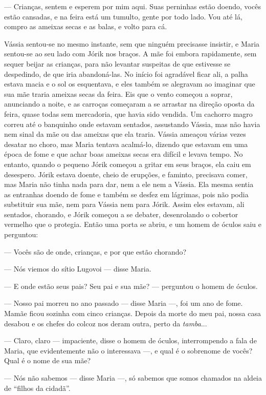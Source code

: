 --- Crianças, sentem e esperem por mim aqui. Suas perninhas estão
doendo, vocês estão cansadas, e na feira está um tumulto, gente por todo
lado. Vou até lá, compro as ameixas secas e as balas, e volto para cá.

Vássia sentou-se no mesmo instante, sem que ninguém precisasse insistir,
e Maria sentou-se ao seu lado com Jórik nos braços. A mãe foi embora
rapidamente, sem sequer beijar as crianças, para não levantar suspeitas
de que estivesse se despedindo, de que iria abandoná-las. No início foi
agradável ficar ali, a palha estava macia e o sol os esquentava, e eles
também se alegravam ao imaginar que sua mãe traria ameixas secas da
feira. Eis que o vento começou a soprar, anunciando a noite, e as
carroças começaram a se arrastar na direção oposta da feira, quase todas
sem mercadoria, que havia sido vendida. Um cachorro magro correu até o
banquinho onde estavam sentados, assustando Vássia, mas não havia nem
sinal da mãe ou das ameixas que ela traria. Vássia ameaçou várias vezes
desatar no choro, mas Maria tentava acalmá-lo, dizendo que estavam em
uma época de fome e que achar boas ameixas secas era difícil e levava
tempo. No entanto, quando o pequeno Jórik começou a gritar em seus
braços, ela caiu em desespero. Jórik estava doente, cheio de erupções, e
faminto, precisava comer, mas Maria não tinha nada para dar, nem a ele
nem a Vássia. Ela mesma sentia as entranhas doendo de fome e também se
desfez em lágrimas, pois não podia substituir sua mãe, nem para Vássia
nem para Jórik. Assim eles estavam, ali sentados, chorando, e Jórik
começou a se debater, desenrolando o cobertor vermelho que o protegia.
Então uma porta se abriu, e um homem de óculos saiu e perguntou:

--- Vocês são de onde, crianças, e por que estão chorando?

--- Nós viemos do sítio Lugovoi --- disse Maria.

--- E onde estão seus pais? Seu pai e sua mãe? --- perguntou o homem de
óculos.

--- Nosso pai morreu no ano passado --- disse Maria ---, foi um ano de
fome. Mamãe ficou sozinha com cinco crianças. Depois da morte do meu
pai, nossa casa desabou e os chefes do colcoz nos deram outra, perto da
\emph{tamba}...

--- Claro, claro --- impaciente, disse o homem de óculos, interrompendo
a fala de Maria, que evidentemente não o interessava ---, e qual é o
sobrenome de vocês? Qual é o nome de sua mãe?

--- Nós não sabemos --- disse Maria ---, só sabemos que somos chamados
na aldeia de ``filhos da cidadã''.

